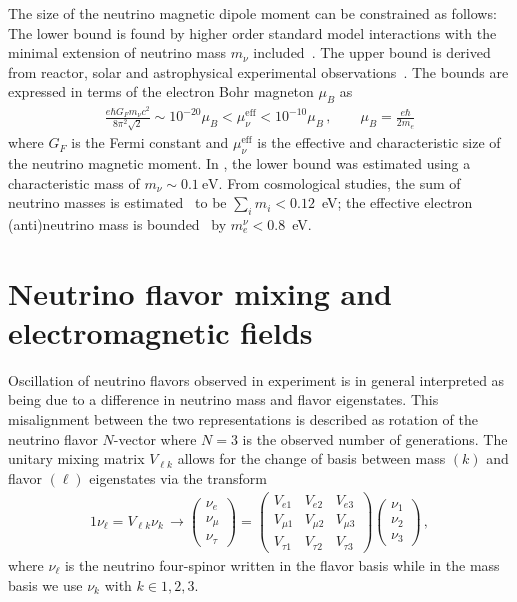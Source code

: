 The size of the neutrino magnetic dipole moment can be constrained as follows: The lower bound is found by higher order standard model interactions with the minimal extension of neutrino mass $m_{\nu}$ included~\citep{Fujikawa:1980yx,Shrock:1980vy,Shrock:1982sc}. The upper bound is derived from reactor, solar and astrophysical experimental observations~\citep{Giunti:2015gga,Canas:2015yoa,Studenikin:2016ykv,AristizabalSierra:2021fuc}. The bounds are expressed in terms of the electron Bohr magneton $\mu_{B}$ as
\begin{align}
    \label{bound:1}
    \frac{e\hbar G_{F}m_{\nu}c^{2}}{8\pi^{2}\sqrt{2}} \sim 10^{-20}\mu_{B}<\mu_{\nu}^\mathrm{eff}<10^{-10}\mu_{B}\,,\qquad\mu_{B}=\frac{e\hbar}{2m_{e}}
\end{align}
where $G_{F}$ is the Fermi constant and $\mu_{\nu}^\mathrm{eff}$ is the effective and characteristic size of the neutrino magnetic moment. In , the lower bound was estimated using a characteristic mass of $m_{\nu}\sim0.1~\mathrm{eV}$. From cosmological studies, the sum of neutrino masses is estimated~\citep{Planck:2018vyg} to be $\sum_{i}m_{i}<0.12$~eV; the effective electron (anti)neutrino mass is bounded~\citep{KATRIN:2021uub} by $m_{e}^{\nu}<0.8$~eV.

\section{Neutrino flavor mixing and electromagnetic fields}
\label{sec:nuflavor}
Oscillation of neutrino flavors observed in experiment is in general interpreted as being due to a difference in neutrino mass and flavor eigenstates. This misalignment between the two representations is described as rotation of the neutrino flavor $N$-vector where $N=3$ is the observed number of generations. The unitary mixing matrix $V_{\ell k}$ allows for the change of basis between mass $(k)$ and flavor $(\ell)$ eigenstates via the transform 
\begin{alignat}{1}
    \label{basis:1} \nu_{\ell}=V_{\ell k}\nu_{k}\,\rightarrow
    \begin{pmatrix}
        \nu_{e}\\
        \nu_{\mu}\\
        \nu_{\tau}
    \end{pmatrix}=
    \begin{pmatrix}
        V_{e1} & V_{e2} & V_{e3}\\
        V_{\mu1} & V_{\mu2} & V_{\mu3}\\
        V_{\tau1} & V_{\tau2} & V_{\tau3}
    \end{pmatrix}
    \begin{pmatrix}
        \nu_{1}\\
        \nu_{2}\\
        \nu_{3}
    \end{pmatrix}\,,
\end{alignat}
where $\nu_{\ell}$ is the neutrino four-spinor written in the flavor basis while in the mass basis we use $\nu_{k}$ with $k\in1,2,3$.

